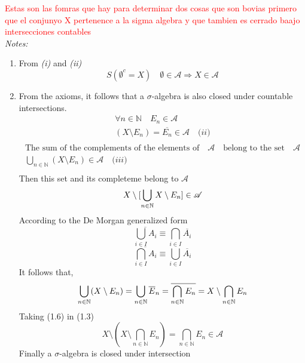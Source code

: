 \documentclass[10pt, oneside]{article}
\numberwithin{equation}{section}
\begin{document}
\textcolor{red}{Estas son las fomras que hay para determinar dos cosas que son bovias primero que el conjunyo X pertenence a la sigma algebra y que tambien es cerrado baajo intersecciones contables}\\
\textit{Notes:}
\begin{enumerate}[label=(\alph*)]
    \item From \textit{(i)} and \textit{(ii)}
    \begin{equation}S
         ( \emptyset^c = X)  \quad  \emptyset \in \mathcal{A} \Rightarrow X \in \mathcal{A}
    \end{equation}
    \item From the axioms, it follows that a \(\sigma\)-algebra is also closed under countable  intersections.
\begin{multline}
\forall n \in \mathbb{N} \quad E_n \in \mathcal{A}  \\ 
(X \setminus E_n) = \overline{E_n} \in \mathcal{A} \quad \textit{(ii)}
\\
\end{multline}
\begin{multline*}
\text{The sum of the complements of the elements of} \quad \mathcal{A} \quad  \text{belong to the set} \quad \mathcal{A}\\
\displaystyle \bigcup_{n \in \mathbb{N}} (X \setminus E_n) \in \mathcal{A} \quad \textit{(iii)}\\
\end{multline*}
Then this set and its completeme belong to \(\mathcal{A}\)
\begin{equation}
X \setminus [\displaystyle \bigcup_{n \in \mathbb{N}} X \setminus E_{n}] \in \mathcal{A}\\ 
\end{equation}
According to the De Morgan generalized form 
\begin{equation}
    \overline{\displaystyle \bigcup_{i \in I} A_{i}} \equiv \displaystyle \bigcap_{i \in I}\overline{A_i}
\end{equation}
\begin{equation}
    \overline{\displaystyle \bigcap_{i \in I} A_{i}} \equiv \displaystyle \bigcup_{i \in I}\overline{A_i}
\end{equation}
It follows that,
\begin{equation}
    \bigcup_{n \in \mathbb{N}} (X\setminus E_n) = \bigcup_{n \in \mathbb{N}} \overline E_n = \overline{\bigcap_{n \in \mathbb{N}}E_n} = X\setminus \bigcap_{n \in \mathbb{N}}E_n\\
\end{equation}
Taking (1.6) in (1.3)
\begin{equation}
    X \setminus (X \setminus \bigcap_{n \in \mathbb{N}} E_n ) = \bigcap_{n \in \mathbb{N}}E_n \in \mathcal{A}
\end{equation}
Finally a \(\sigma\)-algebra is closed under intersection
\end{enumerate}
\end{document}
